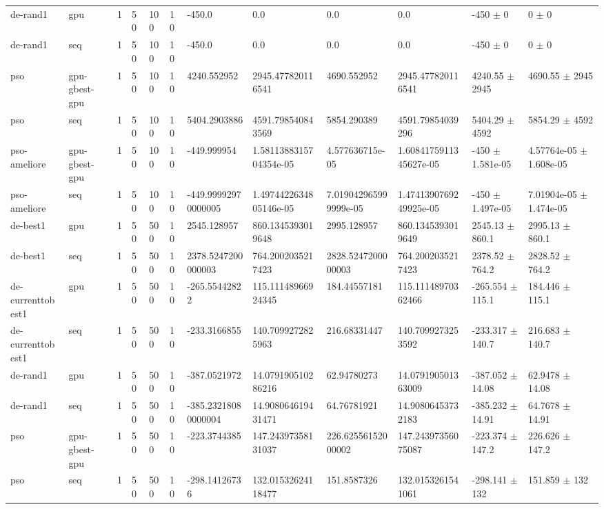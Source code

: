 \begin{table}[t]
\begin{tabular}{llllllllllll}
de-rand1 & gpu & 1 & 50 & 100 & 10 & -450.0 & 0.0 & 0.0 & 0.0 & -450 $\pm$ 0 & 0 $\pm$ 0 \\
de-rand1 & seq & 1 & 50 & 100 & 10 & -450.0 & 0.0 & 0.0 & 0.0 & -450 $\pm$ 0 & 0 $\pm$ 0 \\
pso & gpu-gbest-gpu & 1 & 50 & 100 & 10 & 4240.552952 & 2945.477820116541 & 4690.552952 & 2945.477820116541 & 4240.55 $\pm$ 2945 & 4690.55 $\pm$ 2945 \\
pso & seq & 1 & 50 & 100 & 10 & 5404.2903886 & 4591.798540843569 & 5854.290389 & 4591.79854039296 & 5404.29 $\pm$ 4592 & 5854.29 $\pm$ 4592 \\
pso-ameliore & gpu-gbest-gpu & 1 & 50 & 100 & 10 & -449.999954 & 1.5811388315704354e-05 & 4.577636715e-05 & 1.6084175911345627e-05 & -450 $\pm$ 1.581e-05 & 4.57764e-05 $\pm$ 1.608e-05 \\
pso-ameliore & seq & 1 & 50 & 100 & 10 & -449.99992970000005 & 1.4974422634805146e-05 & 7.019042965999999e-05 & 1.4741390769249925e-05 & -450 $\pm$ 1.497e-05 & 7.01904e-05 $\pm$ 1.474e-05 \\
de-best1 & gpu & 1 & 50 & 500 & 10 & 2545.128957 & 860.1345393019648 & 2995.128957 & 860.1345393019649 & 2545.13 $\pm$ 860.1 & 2995.13 $\pm$ 860.1 \\
de-best1 & seq & 1 & 50 & 500 & 10 & 2378.5247200000003 & 764.2002035217423 & 2828.5247200000003 & 764.2002035217423 & 2378.52 $\pm$ 764.2 & 2828.52 $\pm$ 764.2 \\
de-currenttobest1 & gpu & 1 & 50 & 500 & 10 & -265.55442822 & 115.11148966924345 & 184.44557181 & 115.11148970362466 & -265.554 $\pm$ 115.1 & 184.446 $\pm$ 115.1 \\
de-currenttobest1 & seq & 1 & 50 & 500 & 10 & -233.3166855 & 140.7099272825963 & 216.68331447 & 140.7099273253592 & -233.317 $\pm$ 140.7 & 216.683 $\pm$ 140.7 \\
de-rand1 & gpu & 1 & 50 & 500 & 10 & -387.0521972 & 14.079190510286216 & 62.94780273 & 14.079190501363009 & -387.052 $\pm$ 14.08 & 62.9478 $\pm$ 14.08 \\
de-rand1 & seq & 1 & 50 & 500 & 10 & -385.23218080000004 & 14.908064619431471 & 64.76781921 & 14.90806453732183 & -385.232 $\pm$ 14.91 & 64.7678 $\pm$ 14.91 \\
pso & gpu-gbest-gpu & 1 & 50 & 500 & 10 & -223.3744385 & 147.24397358131037 & 226.62556152000002 & 147.24397356075087 & -223.374 $\pm$ 147.2 & 226.626 $\pm$ 147.2 \\
pso & seq & 1 & 50 & 500 & 10 & -298.14126736 & 132.01532624118477 & 151.8587326 & 132.0153261541061 & -298.141 $\pm$ 132 & 151.859 $\pm$ 132 \\

\end{tabular}
\end{table}
